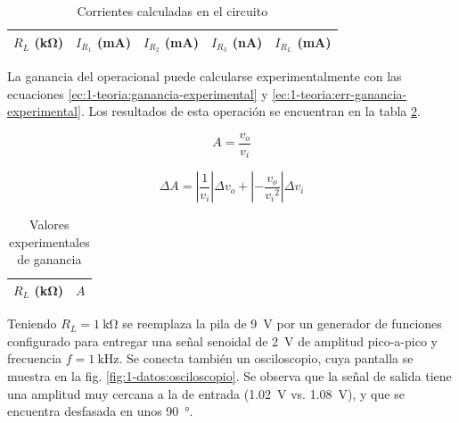 \begin{table}[H]
    \centering
    \begin{tabular}{@{}rrrrr@{}}
        \toprule
        $R_L$ (\si{\kilo\ohm}) & $I_{R_1}$ (\si{\milli\ampere}) & $I_{R_2}$ (\si{\milli\ampere}) & $I_{R_3}$ (\si{\nano\ampere}) & $I_{R_L}$ (\si{\milli\ampere}) \\
        \midrule
        
    \end{tabular}
    \caption{Corrientes calculadas en el circuito}
    \label{tab:1-datos:corrientes}
\end{table}

La ganancia del operacional puede calcularse experimentalmente con las
ecuaciones \ref{ec:1-teoria:ganancia-experimental} y
\ref{ec:1-teoria:err-ganancia-experimental}. Los resultados de esta
operación se encuentran en la tabla \ref{tab:1-teoria:ganancia-experimental}.

\begin{equation}
    \label{ec:1-teoria:ganancia-experimental}
    A = \frac{v_o}{v_i}
\end{equation}

\begin{equation}
    \label{ec:1-teoria:err-ganancia-experimental}
    \Delta A = \left| \frac{1}{v_i} \right| \Delta v_o + \left| -\frac{v_o}{{v_i}^2} \right| \Delta v_i
\end{equation}

\begin{table}[H]
    \centering
    \begin{tabular}{@{}rr@{}}
        \toprule
        $R_L$ (\si{\kilo\ohm}) & $A$ \\
        \midrule
        
    \end{tabular}
    \caption{Valores experimentales de ganancia}
    \label{tab:1-teoria:ganancia-experimental}
\end{table}


Teniendo $R_L = \SI{1}{\kilo\ohm}$ se reemplaza la pila de \SI{9}{\volt} por
un generador de funciones configurado para entregar una señal senoidal de
\SI{2}{\volt} de amplitud pico-a-pico y frecuencia $f = \SI{1}{\kilo\hertz}$.
Se conecta también un osciloscopio, cuya pantalla
se muestra en la fig. \ref{fig:1-datos:osciloscopio}. Se observa que la señal
de salida tiene una amplitud muy cercana a la de entrada (\SI{1.02}{\volt} vs.
\SI{1.08}{\volt}), y que se encuentra desfasada en unos \SI{90}{\degree}.

